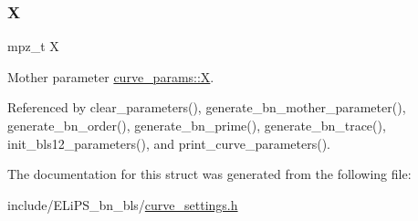 \subsubsection{\texorpdfstring{X}{X}}
{\footnotesize\ttfamily mpz\+\_\+t X}

Mother parameter \hyperlink{structcurve__params_aafd3c8facd30604e0786d7d2885f373d}{curve\+\_\+params\+::X}. 

Referenced by clear\+\_\+parameters(), generate\+\_\+bn\+\_\+mother\+\_\+parameter(), generate\+\_\+bn\+\_\+order(), generate\+\_\+bn\+\_\+prime(), generate\+\_\+bn\+\_\+trace(), init\+\_\+bls12\+\_\+parameters(), and print\+\_\+curve\+\_\+parameters().



The documentation for this struct was generated from the following file\+:\begin{DoxyCompactItemize}
\item 
include/\+E\+Li\+P\+S\+\_\+bn\+\_\+bls/\hyperlink{curve__settings_8h}{curve\+\_\+settings.\+h}\end{DoxyCompactItemize}

